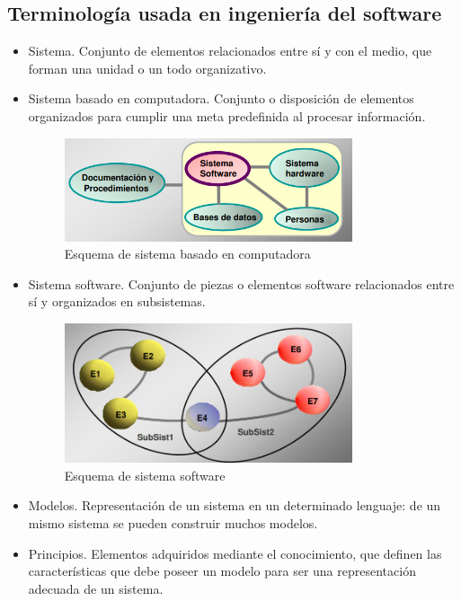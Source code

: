\documentclass{article}
\begin{document}
\subsection{Terminología usada en ingeniería del software}
\begin{itemize}
\item Sistema. Conjunto de elementos relacionados entre sí y con el medio, que forman una unidad o un todo organizativo.

\item Sistema basado en computadora. Conjunto o disposición de elementos organizados para cumplir una meta predefinida al procesar información.

\begin{figure}[h]
\centering
\caption{Esquema de sistema basado en computadora}
\includegraphics[scale=1,width=0.8\textwidth]{ejemplo_sistema_computadora.png}
\end{figure}

\item Sistema software. Conjunto de piezas o elementos software relacionados entre sí y organizados en subsistemas.

\begin{figure}
\centering
\caption{Esquema de sistema software}
\includegraphics[scale=1,width=0.8\textwidth]{sistema_software.png}
\end{figure}

\item Modelos. Representación de un sistema en un determinado lenguaje: de un mismo sistema se pueden construir muchos modelos.

\item Principios. Elementos adquiridos mediante el conocimiento, que definen las características que debe poseer un modelo para ser una representación adecuada de un sistema.


\end{itemize}
\end{document}
